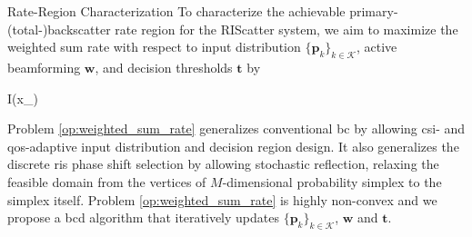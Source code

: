 \documentclass[journal]{IEEEtran}
\begin{document}
\begin{section}{Rate-Region Characterization}
	To characterize the achievable primary-(total-)backscatter rate region for the RIScatter system, we aim to maximize the weighted sum rate with respect to input distribution $\{\boldsymbol{p}_k\}_{k \in \mathcal{K}}$, active beamforming $\boldsymbol{w}$, and decision thresholds $\boldsymbol{t}$ by
	\begin{maxi!}
		{}{I(x_{})}{\label{op:weighted_sum_rate}}{\label{ob:weighted_sum_rate}}
	\end{maxi!}

	Problem \eqref{op:weighted_sum_rate} generalizes conventional \gls{bc} by allowing \gls{csi}- and \gls{qos}-adaptive input distribution and decision region design.
	It also generalizes the discrete \gls{ris} phase shift selection by allowing stochastic reflection, relaxing the feasible domain from the vertices of $M$-dimensional probability simplex to the simplex itself.
	Problem \eqref{op:weighted_sum_rate} is highly non-convex and we propose a \gls{bcd} algorithm that iteratively updates $\{\boldsymbol{p}_k\}_{k \in \mathcal{K}}$, $\boldsymbol{w}$ and $\boldsymbol{t}$.


\end{section}
\end{document}
